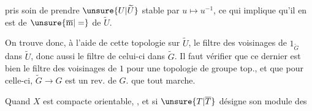  pris soin de prendre $\unsure{U|\widetilde U}$ stable par $u\mapsto u^{-1}$, ce qui implique qu'il en est de $\unsure{\overline{\mathrm m}|=}$ de $\widetilde U$.

On trouve donc, à l'aide de cette topologie sur $\widetilde U$,  le filtre des voisinages de $1_{\widetilde G}$ dans $\widetilde U$, donc aussi le filtre  de celui-ci dans $\widetilde G$. Il faut vérifier que ce dernier est bien le filtre des voisinages de $1$ pour une topologie de groupe top., et que pour celle-ci, $\widetilde G\to G$ est un rev. de $G$.  que tout marche.

Quand $X$ est  compacte orientable, , et  si $\unsure{T|\overline T}$ désigne son module des




